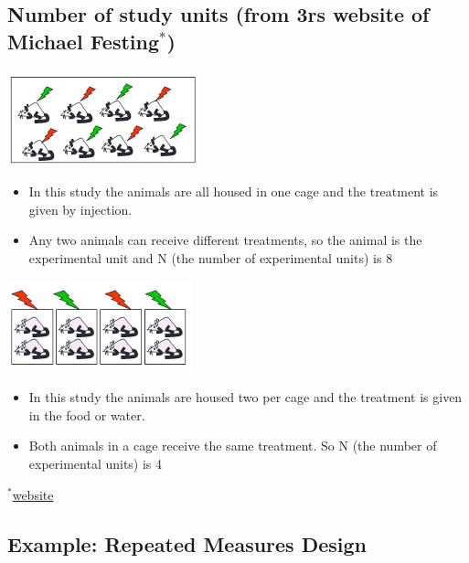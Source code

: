 \documentclass[
]{book}
\providecommand{\tightlist}{%
  \setlength{\itemsep}{0pt}\setlength{\parskip}{0pt}}
\begin{document}
\hypertarget{number-of-study-units-from-3rs-website-of-michael-festing}{%
\subsection{\texorpdfstring{Number of study units (from 3rs website of Michael Festing\(^*\))}{Number of study units (from 3rs website of Michael Festing\^{}*)}}\label{number-of-study-units-from-3rs-website-of-michael-festing}}

\includegraphics[width=0.5\linewidth]{./11_08a}

\begin{itemize}
\tightlist
\item
  In this study the animals are all housed in one cage and the treatment is given by injection.
\item
  Any two animals can receive different treatments, so the animal is the experimental unit and N (the number of experimental units) is 8
\end{itemize}

\includegraphics[width=0.5\linewidth]{./11_08b}

\begin{itemize}
\tightlist
\item
  In this study the animals are housed two per cage and the treatment is given in the food or water.
\item
  Both animals in a cage receive the same treatment. So N (the number of experimental units) is 4
\end{itemize}

\(^*\)\href{http://www.3rs-reduction.co.uk/}{website}

\hypertarget{example-repeated-measures-design-1}{%
\subsection{Example: Repeated Measures Design}\label{example-repeated-measures-design-1}}
\end{document}
